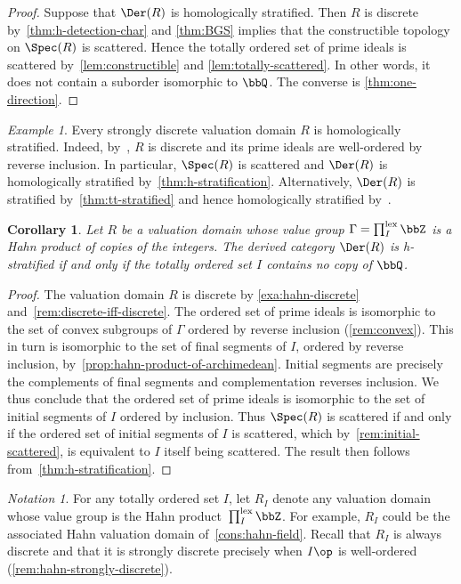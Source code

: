 \documentclass{amsart}
\numberwithin{equation}{section}%
\newtheorem{Cor}[equation]{Corollary}
\theoremstyle{remark}
\newtheorem{Not}[equation]{Notation}
\newtheorem{Exa}[equation]{Example}
\begin{document}
\begin{proof}
	Suppose that $\Der(R)$ is homologically stratified. Then $R$ is discrete by~\cref{thm:h-detection-char} and \cref{thm:BGS} implies that the constructible topology on $\Spec(R)$ is scattered. Hence the totally ordered set of prime ideals is scattered by~\cref{lem:constructible} and \cref{lem:totally-scattered}. In other words, it does not contain a suborder isomorphic to $\bbQ$. The converse is \cref{thm:one-direction}.
\end{proof}

\begin{Exa}
	Every strongly discrete valuation domain $R$ is homologically stratified. Indeed, by~\cite[Theorem~II.8.3]{FuchsSalce01}, $R$ is discrete and its prime ideals are well-ordered by reverse inclusion. In particular, $\Spec(R)$ is scattered and $\Der(R)$ is homologically stratified by~\cref{thm:h-stratification}. Alternatively, $\Der(R)$ is stratified by~\cref{thm:tt-stratified} and hence homologically stratified by~\cite[Theorem~9.6]{BarthelHeardSandersZou26}.
\end{Exa}

\begin{Cor}
	Let $R$ be a valuation domain whose value group $\Gamma=\prod_I^{\mathrm{lex}} \bbZ$ is a Hahn product of copies of the integers. The derived category $\Der(R)$ is h-stratified if and only if the totally ordered set $I$ contains no copy of $\bbQ$.
\end{Cor}

\begin{proof}
	The valuation domain $R$ is discrete by \cref{exa:hahn-discrete} and~\cref{rem:discrete-iff-discrete}. The ordered set of prime ideals is isomorphic to the set of convex subgroups of $\Gamma$ ordered by reverse inclusion (\cref{rem:convex}). This in turn is isomorphic to the set of final segments of $I$, ordered by reverse inclusion, by~\cref{prop:hahn-product-of-archimedean}. Initial segments are precisely the complements of final segments and complementation reverses inclusion. We thus conclude that the ordered set of prime ideals is isomorphic to the set of initial segments of $I$ ordered by inclusion. Thus $\Spec(R)$ is scattered if and only if the ordered set of initial segments of $I$ is scattered, which by~\cref{rem:initial-scattered}, is equivalent to $I$ itself being scattered. The result then follows from~\cref{thm:h-stratification}.
\end{proof}

\begin{Not}
	For any totally ordered set $I$, let $R_I$ denote any valuation domain whose value group is the Hahn product~$\prod_I^{\mathrm{lex}} \bbZ$. For example, $R_I$ could be the associated Hahn valuation domain of~\cref{cons:hahn-field}. Recall that $R_I$ is always discrete and that it is strongly discrete precisely when $I\op$ is well-ordered (\cref{rem:hahn-strongly-discrete}).
\end{Not}
\end{document}
